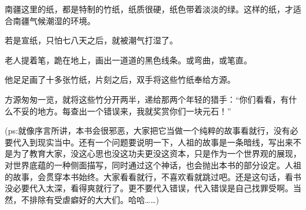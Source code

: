 \begin{this_body}
南疆这里的纸，都是特制的竹纸，纸质很硬，纸色带着淡淡的绿。这样的纸，才适合南疆气候潮湿的环境。

若是宣纸，只怕七八天之后，就被潮气打湿了。

老人提着笔，跪在地上，画出一道道的黑色线条。或弯曲，或笔直。

他足足画了十多张竹纸，片刻之后，双手将这些竹纸奉给方源。

方源匆匆一览，就将这些竹分开两半，递给那两个年轻的猎手：“你们看看，有什么不妥的地方。每查出一个错误来，我就奖赏你们一块元石！”

(ps:就像序言所讲，本书会很邪恶，大家把它当做一个纯粹的故事看就行，没有必要代入到现实当中。还有一个问题要说明一下，人祖的故事是一条暗线，写出来不是为了教育大家，没这心思也没这功夫更没这资本，只是作为一个世界观的展现，对世界底蕴的一种侧面描写，同时通过这个神话，也会抛出本书的部分设定。人祖的故事，会贯穿本书始终。大家看看就行，不喜欢看就跳过吧。还是这句话，看书没必要代入太深，看得爽就行了。更不要代入错误，代入错误是自己找罪受啊。当然，不排除有受虐癖好的大大们。哈哈……)

\end{this_body}

